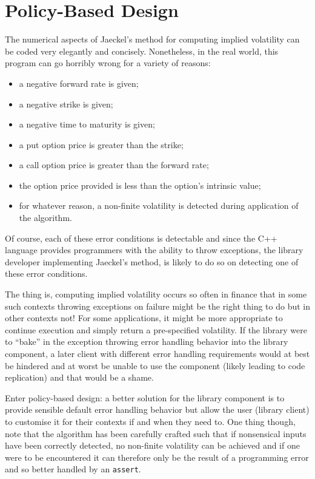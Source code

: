 \documentclass[a4paper,twoside,twocolumn]{article}
\begin{document}
\section{Policy-Based Design}
The numerical aspects of Jaeckel's method for computing implied
volatility can be coded very elegantly and concisely. Nonetheless, in
the real world, this program can go horribly wrong for a variety of
reasons:
\begin{itemize}
\item{a negative forward rate is given;}
\item{a negative strike is given;}
\item{a negative time to maturity is given;}
\item{a put option price is greater than the strike;}
\item{a call option price is greater than the forward rate;}
\item{the option price provided is less than the option's intrinsic value;}
\item{for whatever reason, a non-finite volatility is detected during
application of the algorithm.}
\end{itemize}
Of course, each of these error conditions is detectable and since the
C++ language provides programmers with the ability to throw
exceptions, the library developer implementing Jaeckel's method, is
likely to do so on detecting one of these error conditions.

The thing is, computing implied volatility occurs so often in finance
that in some such contexts throwing exceptions on failure might be the
right thing to do but in other contexts not! For some applications, it
might be more appropriate to continue execution and simply return a
pre-specified volatility. If the library were to ``bake'' in the
exception throwing error handling behavior into the library
component, a later client with different error handling requirements
would at best be hindered and at worst be unable to use the component
(likely leading to code replication) and that would be a shame.

Enter policy-based design: a better solution for the library
component is to provide sensible default error handling behavior but
allow the user (library client) to customise it for their contexts if
and when they need to. One thing though, note that the algorithm has
been carefully crafted such that if nonsensical inputs have been
correctly detected, no non-finite volatility can be achieved and if
one were to be encountered it can therefore only be the result of a
programming error and so better handled by an \verb|assert|.
\end{document}
